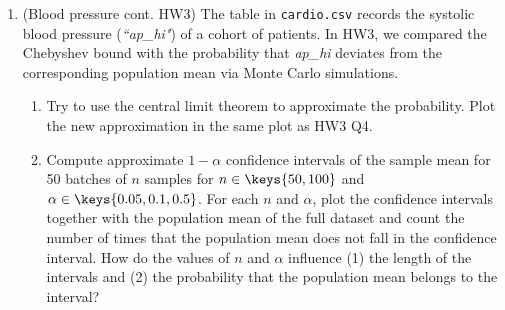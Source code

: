 \documentclass[12pt,twoside]{article}
\begin{document}
\begin{enumerate}
\item (Blood pressure cont. HW3)
The table in \texttt{cardio.csv} records the systolic blood pressure (\textit{``ap\_hi"}) of a cohort of patients. In HW3, we compared the Chebyshev bound with the probability that \textit{ap\_hi} deviates from the corresponding population mean via Monte Carlo simulations.

\begin{enumerate}
    \item  Try to use the central limit theorem to approximate the probability. Plot the new approximation in the same plot as HW3 Q4.
    \item Compute approximate $1-\alpha$ confidence intervals of the sample mean for 50 batches of $n$ samples for $n \in \keys{50, 100}$ and $\alpha \in \keys{0.05, 0.1, 0.5}$. For each $n$ and $\alpha$, plot the confidence intervals together with the population mean of the full dataset and count the number of times that the population mean does not fall in the confidence interval. How do the values of $n$ and $\alpha$ influence (1) the length of the intervals and (2) the probability that the population mean belongs to the interval?
\end{enumerate}


\end{enumerate}
\end{document}
